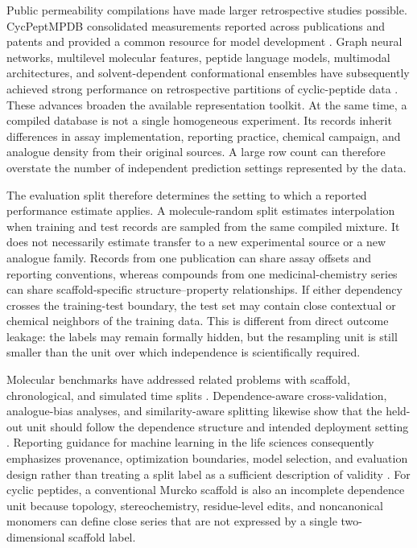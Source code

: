 \documentclass[referee,lineno,pdflatex,sn-vancouver-num]{sn-jnl}
\begin{document}
Public permeability compilations have made larger retrospective studies possible. CycPeptMPDB consolidated measurements reported across publications and patents and provided a common resource for model development \cite{li2023cycpeptmpdb}. Graph neural networks, multilevel molecular features, peptide language models, multimodal architectures, and solvent-dependent conformational ensembles have subsequently achieved strong performance on retrospective partitions of cyclic-peptide data \cite{li2024cycpeptmp,feller2025peptideclm,wang2025multicycpermea,wen2026ensemblecycperm}. These advances broaden the available representation toolkit. At the same time, a compiled database is not a single homogeneous experiment. Its records inherit differences in assay implementation, reporting practice, chemical campaign, and analogue density from their original sources. A large row count can therefore overstate the number of independent prediction settings represented by the data.

The evaluation split therefore determines the setting to which a reported performance estimate applies. A molecule-random split estimates interpolation when training and test records are sampled from the same compiled mixture. It does not necessarily estimate transfer to a new experimental source or a new analogue family. Records from one publication can share assay offsets and reporting conventions, whereas compounds from one medicinal-chemistry series can share scaffold-specific structure--property relationships. If either dependency crosses the training-test boundary, the test set may contain close contextual or chemical neighbors of the training data. This is different from direct outcome leakage: the labels may remain formally hidden, but the resampling unit is still smaller than the unit over which independence is scientifically required.

Molecular benchmarks have addressed related problems with scaffold, chronological, and simulated time splits \cite{wu2018moleculenet,yang2019representations,sheridan2013timesplit,landrum2023simpd}. Dependence-aware cross-validation, analogue-bias analyses, and similarity-aware splitting likewise show that the held-out unit should follow the dependence structure and intended deployment setting \cite{roberts2017crossvalidation,wallach2018analogue,kalinina2025datasail}. Reporting guidance for machine learning in the life sciences consequently emphasizes provenance, optimization boundaries, model selection, and evaluation design rather than treating a split label as a sufficient description of validity \cite{walsh2021dome}. For cyclic peptides, a conventional Murcko scaffold is also an incomplete dependence unit because topology, stereochemistry, residue-level edits, and noncanonical monomers can define close series that are not expressed by a single two-dimensional scaffold label.
\end{document}
